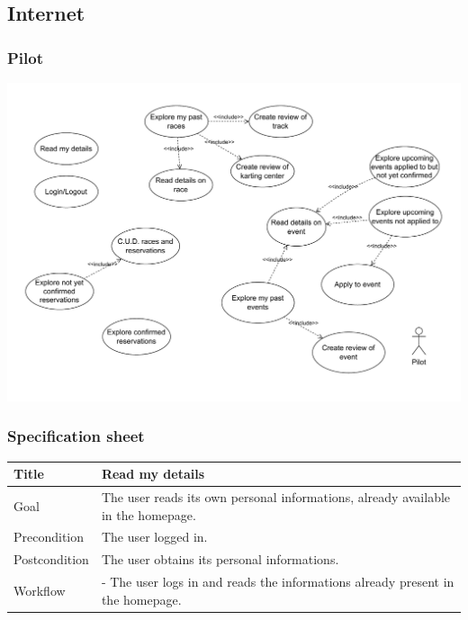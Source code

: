 \documentclass{beamer}
\begin{document}
\subsection*{Internet}

\begin{frame}
    \frametitle{Pilot}
    \centering
    \includegraphics[width=0.9\linewidth]{drawio/pilot.pdf}
\end{frame}


\begin{frame}
    \frametitle{Specification sheet}
    \begin{table}
        \tiny
        \begin{tabular}{|p{2cm}|p{6cm}|}
        \hline
        Title & \textbf{Read my details} \\
        \hline
        Goal & The user reads its own personal informations, already available in the homepage.\\
        \hline
        Precondition & The user logged in. \\
        \hline
        Postcondition & The user obtains its personal informations. \\
        \hline
        Workflow &
        - The user logs in and reads the informations already present in the homepage. \\
        \hline
        \end{tabular}
\end{table}
\end{frame}
\end{document}
